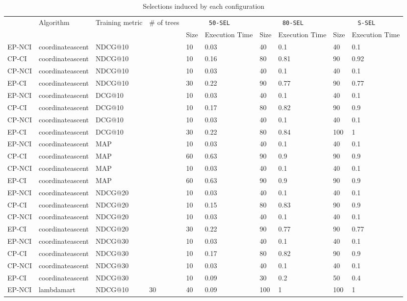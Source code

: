 \begin{landscape}
\begin{longtable}{|*{10}{l|}}
\caption{Selections induced by each configuration}
\hline\endhead
\hline\endfoot
\multirow{2}{*}{Dataset}&
\multirow{2}{*}{Algorithm}&
\multirow{2}{*}{Training metric}&
\multirow{2}{*}{\# of trees}&
\multicolumn{2}{c|}{\texttt{50-SEL}}&
\multicolumn{2}{c|}{\texttt{80-SEL}}&
\multicolumn{2}{c|}{\texttt{S-SEL}}\\
&&&&Size&Execution Time&Size&Execution Time&Size&Execution Time\\
EP-NCI&coordinateascent&NDCG@10&&10&0.03&40&0.1&40&0.1\\
CP-CI&coordinateascent&NDCG@10&&10&0.16&80&0.81&90&0.92\\
CP-NCI&coordinateascent&NDCG@10&&10&0.03&40&0.1&40&0.1\\
EP-CI&coordinateascent&NDCG@10&&30&0.22&90&0.77&90&0.77\\
\hline
EP-NCI&coordinateascent&DCG@10&&10&0.03&40&0.1&40&0.1\\
CP-CI&coordinateascent&DCG@10&&10&0.17&80&0.82&90&0.9\\
CP-NCI&coordinateascent&DCG@10&&10&0.03&40&0.1&40&0.1\\
EP-CI&coordinateascent&DCG@10&&30&0.22&80&0.84&100&1\\
\hline
EP-NCI&coordinateascent&MAP&&10&0.03&40&0.1&40&0.1\\
CP-CI&coordinateascent&MAP&&60&0.63&90&0.9&90&0.9\\
CP-NCI&coordinateascent&MAP&&10&0.03&40&0.1&40&0.1\\
EP-CI&coordinateascent&MAP&&60&0.63&90&0.9&90&0.9\\
\hline
EP-NCI&coordinateascent&NDCG@20&&10&0.03&40&0.1&40&0.1\\
CP-CI&coordinateascent&NDCG@20&&10&0.15&80&0.83&90&0.9\\
CP-NCI&coordinateascent&NDCG@20&&10&0.03&40&0.1&40&0.1\\
EP-CI&coordinateascent&NDCG@20&&30&0.22&90&0.77&90&0.77\\
\hline
EP-NCI&coordinateascent&NDCG@30&&10&0.03&40&0.1&40&0.1\\
CP-CI&coordinateascent&NDCG@30&&10&0.17&80&0.82&90&0.9\\
CP-NCI&coordinateascent&NDCG@30&&10&0.03&40&0.1&40&0.1\\
EP-CI&coordinateascent&NDCG@30&&10&0.09&30&0.2&50&0.4\\
\hline
EP-NCI&lambdamart&NDCG@10&30&40&0.09&100&1&100&1\\

\end{longtable}
\end{landscape}
